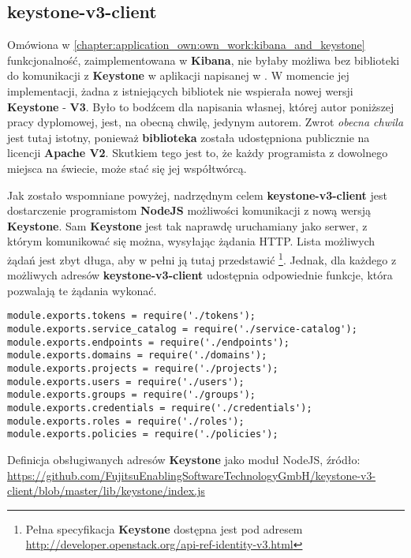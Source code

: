 \subsection{keystone-v3-client}
Omówiona w \ref{chapter:application_own:own_work:kibana_and_keystone} funkcjonalność, zaimplementowana w \textbf{Kibana}, nie byłaby możliwa
bez biblioteki do komunikacji z \textbf{Keystone} w aplikacji napisanej w .
W momencie jej implementacji, żadna z istniejących bibliotek nie wspierała nowej wersji \textbf{Keystone} - \textbf{V3}. 
Było to bodźcem dla napisania własnej, której autor poniższej pracy dyplomowej, jest, na obecną chwilę, jedynym autorem. Zwrot \textit{obecna chwila}
jest tutaj istotny, ponieważ \textbf{biblioteka} została udostępniona publicznie na licencji \textbf{Apache V2}. Skutkiem tego jest to, że
każdy programista z dowolnego miejsca na świecie, może stać się jej współtwórcą. 

Jak zostało wspomniane powyżej, nadrzędnym celem \textbf{keystone-v3-client} jest dostarczenie programistom \textbf{NodeJS} możliwości
komunikacji z nową wersją \textbf{Keystone}. Sam \textbf{Keystone} jest tak naprawdę uruchamiany jako serwer, z którym komunikować się można,
wysyłając żądania HTTP. Lista możliwych żądań jest zbyt długa, aby w pełni ją tutaj przedstawić 
\footnote{Pełna specyfikacja \textbf{Keystone} dostępna jest pod adresem \url{http://developer.openstack.org/api-ref-identity-v3.html}}. Jednak,
dla każdego z możliwych adresów \textbf{keystone-v3-client} udostępnia odpowiednie funkcje, która pozwalają te żądania wykonać.
    \begin{listing}
        \begin{verbatim}
module.exports.tokens = require('./tokens');
module.exports.service_catalog = require('./service-catalog');
module.exports.endpoints = require('./endpoints');
module.exports.domains = require('./domains');
module.exports.projects = require('./projects');
module.exports.users = require('./users');
module.exports.groups = require('./groups');
module.exports.credentials = require('./credentials');
module.exports.roles = require('./roles');
module.exports.policies = require('./policies');
        \end{verbatim}
        \caption[Definicja obsługiwanych adresów \textbf{Keystone}]{
            Definicja obsługiwanych adresów \textbf{Keystone} jako moduł NodeJS, źródło: \url{https://github.com/FujitsuEnablingSoftwareTechnologyGmbH/keystone-v3-client/blob/master/lib/keystone/index.js}}
        \label{chapter:application_own:own_work:keystone_v3_client:endpoints}
    \end{listing}

